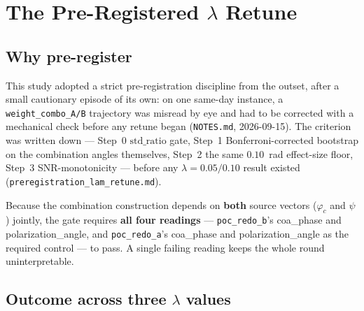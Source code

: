 \section{The Pre-Registered $\lambda$ Retune}
\label{sec:phicpsi:prereg}

\subsection{Why pre-register}
\label{sec:phicpsi:prereg:why}

This study adopted a strict pre-registration discipline from the outset, after a small cautionary episode of its own: on one same-day instance, a \texttt{weight\_combo\_A/B} trajectory was misread by eye and had to be corrected with a mechanical check before any retune began (\texttt{NOTES.md}, 2026-09-15).
The criterion was written down --- Step~0 $\text{std\_ratio}$ gate, Step~1 Bonferroni-corrected bootstrap on the combination angles themselves, Step~2 the same $0.10$~rad effect-size floor, Step~3 SNR-monotonicity --- before any $\lambda=0.05/0.10$ result existed (\texttt{preregistration\_lam\_retune.md}).

Because the combination construction depends on \textbf{both} source vectors ($\varphi_c$ and $\psi$) jointly, the gate requires \textbf{all four readings} --- \texttt{poc\_redo\_b}'s coa\_phase and polarization\_angle, and \texttt{poc\_redo\_a}'s coa\_phase and polarization\_angle as the required control --- to pass.
A single failing reading keeps the whole round uninterpretable.

\subsection{Outcome across three $\lambda$ values}
\label{sec:phicpsi:prereg:outcome}

